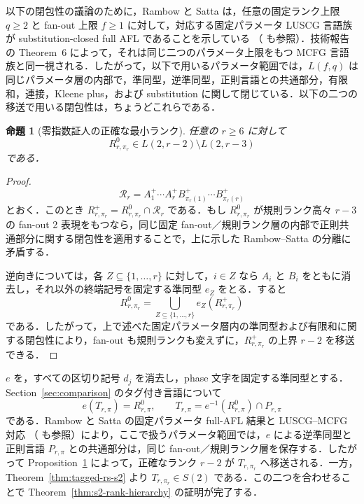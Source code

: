 \documentclass[11pt,a4paper]{ltjsarticle}
\numberwithin{equation}{section}
\theoremstyle{plain}
\newtheorem{proposition}[theorem]{命題}
\theoremstyle{definition}
\theoremstyle{remark}
\begin{document}
以下の閉包性の議論のために，Rambow と Satta は，任意の固定ランク上限 $q\ge2$ と fan-out 上限 $f\ge1$ に対して，対応する固定パラメータ LUSCG 言語族が substitution-closed full AFL であることを示している
\cite[Theorem~5]{RambowSatta1994}（\cite{RambowSatta1999} も参照）．技術報告の Theorem~6 によって，それは同じ二つのパラメータ上限をもつ MCFG 言語族と同一視される．したがって，以下で用いるパラメータ範囲では，$L(f,q)$ は同じパラメータ層の内部で，準同型，逆準同型，正則言語との共通部分，有限和，連接，Kleene plus，および substitution に関して閉じている．以下の二つの移送で用いる閉包性は，ちょうどこれらである．

\begin{proposition}[零指数証人の正確な最小ランク]
\label{prop:rs-zero-rank-only}
任意の $r\ge6$ に対して
\[
 R^0_{r,\pi_r}\in L(2,r-2)\setminus L(2,r-3)
\]
である．
\end{proposition}

\begin{proof}
\[
 \mathcal R_r=A_1^+\cdots A_r^+
 B_{\pi_r(1)}^+\cdots B_{\pi_r(r)}^+
\]
とおく．このとき
$R^+_{r,\pi_r}=R^0_{r,\pi_r}\cap\mathcal R_r$ である．もし $R^0_{r,\pi_r}$ が規則ランク高々 $r-3$ の fan-out 2 表現をもつなら，同じ固定 fan-out／規則ランク層の内部で正則共通部分に関する閉包性を適用することで，上に示した Rambow--Satta の分離に矛盾する．

逆向きについては，各 $Z\subseteq\{1,\ldots,r\}$ に対して，$i\in Z$ なら $A_i$ と $B_i$ をともに消去し，それ以外の終端記号を固定する準同型 $e_Z$ をとる．すると
\[
 R^0_{r,\pi_r}=\bigcup_{Z\subseteq\{1,\ldots,r\}} e_Z(R^+_{r,\pi_r})
\]
である．したがって，上で述べた固定パラメータ層内の準同型および有限和に関する閉包性により，fan-out も規則ランクも変えずに，$R^+_{r,\pi_r}$ の上界 $r-2$ を移送できる．
\end{proof}

$e$ を，すべての区切り記号 $d_j$ を消去し，phase 文字を固定する準同型とする．Section~\ref{sec:comparison} のタグ付き言語について
\[
 e(T_{r,\pi})=R^0_{r,\pi},
 \qquad
 T_{r,\pi}=e^{-1}(R^0_{r,\pi})\cap P_{r,\pi}
\]
である．Rambow と Satta の固定パラメータ full-AFL 結果と LUSCG--MCFG 対応
\cite[Theorems~5 and~6]{RambowSatta1994}（\cite{RambowSatta1999} も参照）により，ここで扱うパラメータ範囲では，$e$ による逆準同型と正則言語 $P_{r,\pi}$ との共通部分は，同じ fan-out／規則ランク層を保存する．したがって Proposition~\ref{prop:rs-zero-rank-only} によって，正確なランク $r-2$ が $T_{r,\pi_r}$ へ移送される．一方，Theorem~\ref{thm:tagged-rs-s2} より $T_{r,\pi_r}\in S(2)$ である．この二つを合わせることで Theorem~\ref{thm:s2-rank-hierarchy} の証明が完了する．
\end{document}
